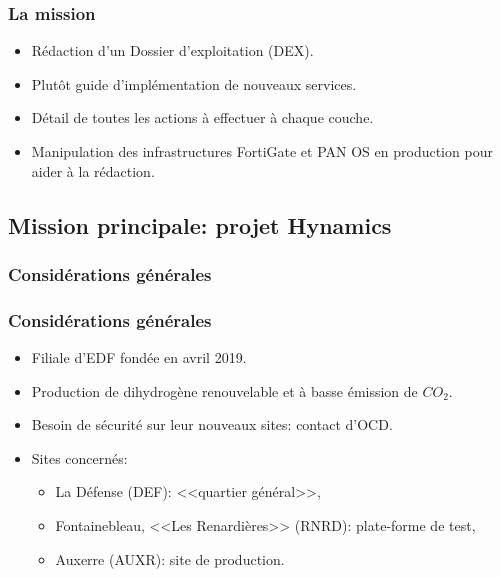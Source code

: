 \documentclass[french, a4paper]{beamer}
\begin{document}
\begin{frame}
    \frametitle{La mission}
    \begin{itemize}
        \item Rédaction d'un Dossier d'exploitation (DEX).
        \item Plutôt guide d'implémentation de nouveaux services.
        \item Détail de toutes les actions à effectuer à chaque couche.
        \item Manipulation des infrastructures FortiGate et PAN OS en production
            pour aider à la rédaction.
    \end{itemize}
\end{frame}

\subsection{Mission principale: projet Hynamics}
\subsubsection{Considérations générales}

\begin{frame}
    \frametitle{Considérations générales}
    \begin{itemize}
        \item Filiale d'EDF fondée en avril 2019.
        \item Production de dihydrogène renouvelable et à basse émission de
            $CO_2$.
        \item Besoin de sécurité sur leur nouveaux sites: contact d'OCD\@.
        \item Sites concernés:
        \begin{itemize}
            \item La Défense (DEF): <<quartier général>>,
            \item Fontainebleau, <<Les Renardières>> (RNRD): plate-forme de
                test,
            \item Auxerre (AUXR): site de production.
        \end{itemize}
    \end{itemize}
\end{frame}
\end{document}
